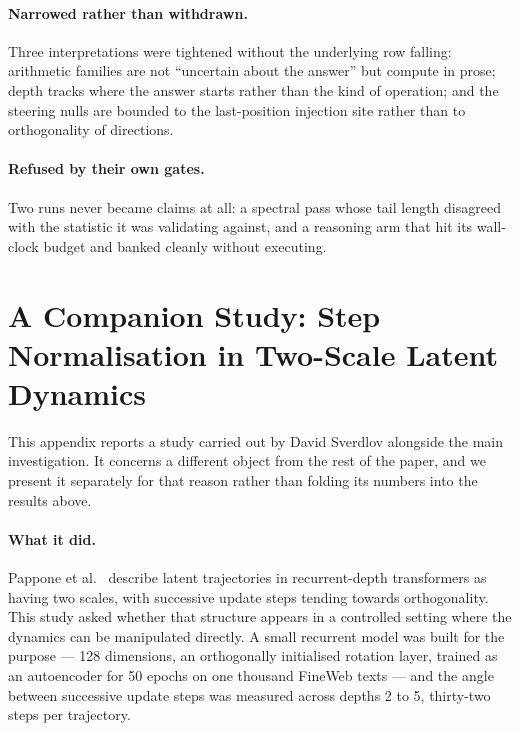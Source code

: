\documentclass{zapiski}
\begin{document}
\paragraph{Narrowed rather than withdrawn.} Three interpretations were tightened without the
underlying row falling: arithmetic families are not ``uncertain about the answer'' but compute in
prose; depth tracks where the answer starts rather than the kind of operation; and the steering
nulls are bounded to the last-position injection site rather than to orthogonality of directions.

\paragraph{Refused by their own gates.} Two runs never became claims at all: a spectral pass whose
tail length disagreed with the statistic it was validating against, and a reasoning arm that hit
its wall-clock budget and banked cleanly without executing.

\section{A Companion Study: Step Normalisation in Two-Scale Latent Dynamics}

This appendix reports a study carried out by David Sverdlov alongside the main investigation. It
concerns a different object from the rest of the paper, and we present it separately for that
reason rather than folding its numbers into the results above.

\paragraph{What it did.} Pappone et al.\ \cite{pappone2025twoscale} describe latent trajectories in
recurrent-depth transformers as having two scales, with successive update steps tending towards
orthogonality. This study asked whether that structure appears in a controlled setting where the
dynamics can be manipulated directly. A small recurrent model was built for the purpose --- 128
dimensions, an orthogonally initialised rotation layer, trained as an autoencoder for 50 epochs on
one thousand FineWeb texts --- and the angle between successive update steps was measured across
depths 2 to 5, thirty-two steps per trajectory.
\end{document}
